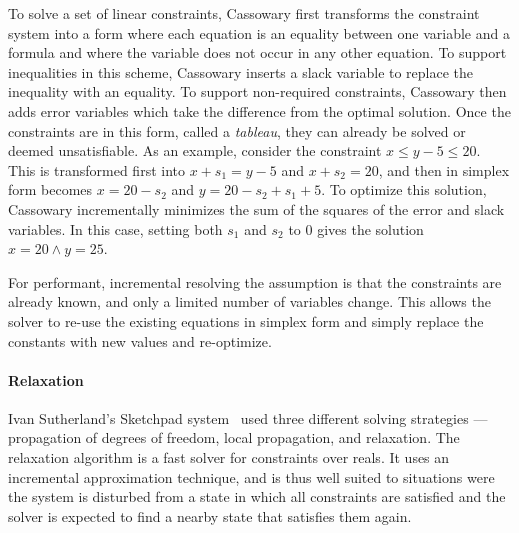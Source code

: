 To solve a set of linear constraints, Cassowary first transforms the constraint
system into a form where each equation is an equality between one variable and a
formula and where the variable does not occur in any other equation. To support
inequalities in this scheme, Cassowary inserts a slack variable to replace the
inequality with an equality. To support non-required constraints, Cassowary then
adds error variables which take the difference from the optimal solution. Once
the constraints are in this form, called a \emph{tableau}, they can already be
solved or deemed unsatisfiable. As an example, consider the constraint
$x \leq y - 5 \leq 20$.  This is transformed first into $x + s_1 = y - 5$ and
$x + s_2 = 20$, and then in simplex form becomes $x = 20 - s_2$ and
$y = 20 - s_2 + s_1 + 5$. To optimize this solution, Cassowary incrementally
minimizes the sum of the squares of the error and slack variables. In this case,
setting both $s_1$ and $s_2$ to 0 gives the solution $x = 20 \wedge y = 25$.

For performant, incremental resolving the assumption is that the
constraints are already known, and only a limited number of variables
change. This allows the solver to re-use the existing equations in
simplex form and simply replace the constants with new values and
re-optimize.

\paragraph{Relaxation}
\label{sec:sutherland}
Ivan Sutherland's Sketchpad system~\cite{sutherland-ifips-1963} used
three different solving strategies --- propagation of degrees of
freedom, local propagation, and relaxation. The relaxation algorithm
is a fast solver for constraints over reals. It uses an incremental
approximation technique, and is thus well suited to situations were
the system is disturbed from a state in which all constraints are
satisfied and the solver is expected to find a nearby state that
satisfies them again.

